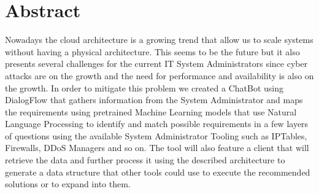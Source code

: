 \chapter*{Abstract}
Nowadays the cloud architecture is a growing trend that allow us to scale systems without having a physical architecture. This seems to be the future but it also presents several challenges for the current IT System Administrators since cyber attacks are on the growth and the need for performance and availability is also on the growth. In order to mitigate this problem we created a ChatBot using DialogFlow that gathers information from the System Administrator and maps the requirements using pretrained Machine Learning models that use Natural Language Processing to identify and match possible requirements in a few layers of questions using the available System Administrator Tooling such as IPTables, Firewalls, DDoS Managers and so on. The tool will also feature a client that will retrieve the data and further process it using the described architecture to generate a data structure that other tools could use to execute the recommended solutions or to expand into them.